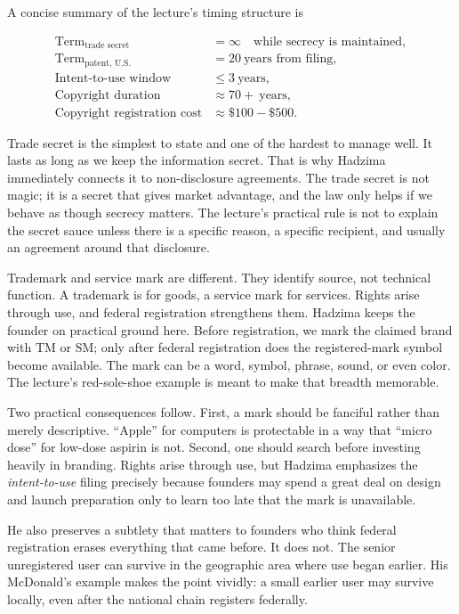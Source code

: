 A concise summary of the lecture's timing structure is

\begin{align}
\text{Term}_{\text{trade secret}} &= \infty \quad \text{while secrecy is maintained},\\
\text{Term}_{\text{patent, U.S.}} &= 20\ \text{years from filing},\\
\text{Intent-to-use window} &\le 3\ \text{years},\\
\text{Copyright duration} &\approx 70+\ \text{years},\\
\text{Copyright registration cost} &\approx \$100-\$500.
\end{align}

Trade secret is the simplest to state and one of the hardest to manage well. It lasts as long as we keep the information secret. That is why Hadzima immediately connects it to non-disclosure agreements. The trade secret is not magic; it is a secret that gives market advantage, and the law only helps if we behave as though secrecy matters. The lecture's practical rule is not to explain the secret sauce unless there is a specific reason, a specific recipient, and usually an agreement around that disclosure.

Trademark and service mark are different. They identify source, not technical function. A trademark is for goods, a service mark for services. Rights arise through use, and federal registration strengthens them. Hadzima keeps the founder on practical ground here. Before registration, we mark the claimed brand with \(\mathrm{TM}\) or \(\mathrm{SM}\); only after federal registration does the registered-mark symbol become available. The mark can be a word, symbol, phrase, sound, or even color. The lecture's red-sole-shoe example is meant to make that breadth memorable.

Two practical consequences follow. First, a mark should be fanciful rather than merely descriptive. ``Apple'' for computers is protectable in a way that ``micro dose'' for low-dose aspirin is not. Second, one should search before investing heavily in branding. Rights arise through use, but Hadzima emphasizes the \emph{intent-to-use} filing precisely because founders may spend a great deal on design and launch preparation only to learn too late that the mark is unavailable.

He also preserves a subtlety that matters to founders who think federal registration erases everything that came before. It does not. The senior unregistered user can survive in the geographic area where use began earlier. His McDonald's example makes the point vividly: a small earlier user may survive locally, even after the national chain registers federally.

